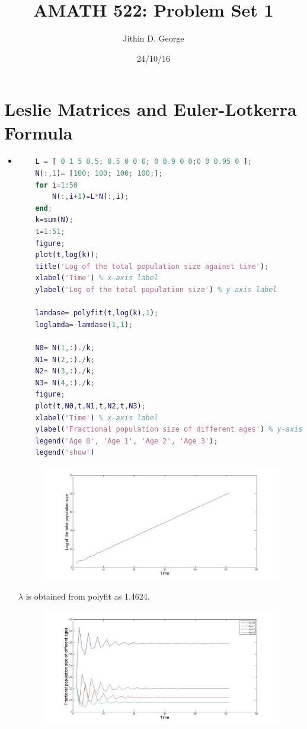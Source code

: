 \documentclass[a4paper]{article}
\title{AMATH 522: Problem Set 1}
\author{Jithin D. George}
\date{24/10/16}
\begin{document}
\maketitle

\section{Leslie Matrices and Euler-Lotkerra Formula}
 \begin{itemize}
 	\item  
 	\begin{lstlisting}[language=Matlab,frame=single]
	%% Problem Set 1 - Euler Lotkerra
	L = [ 0 1 5 0.5; 0.5 0 0 0; 0 0.9 0 0;0 0 0.95 0 ];
	N(:,1)= [100; 100; 100; 100;];
	for i=1:50
		N(:,i+1)=L*N(:,i);
	end;
	k=sum(N);
	t=1:51;
	figure;
	plot(t,log(k));
	title('Log of the total population size against time');
	xlabel('Time') % x-axis label
	ylabel('Log of the total population size') % y-axis label
	
	lamdase= polyfit(t,log(k),1);
	loglamda= lamdase(1,1);
	
	N0= N(1,:)./k;
	N1= N(2,:)./k;
	N2= N(3,:)./k;
	N3= N(4,:)./k;
	figure;
	plot(t,N0,t,N1,t,N2,t,N3);
	xlabel('Time') % x-axis label
	ylabel('Fractional population size of different ages') % y-axis label
	legend('Age 0', 'Age 1', 'Age 2', 'Age 3');
	legend('show')

 	\end{lstlisting}
 	
 	 \begin{figure}[h]
 	 	\centering
 	 	\includegraphics[width=12cm]{F1}
 	 \end{figure}
 
    $\lambda$ is obtained from polyfit as 1.4624.
 	
  	 \begin{figure}[h]
  	 	\centering
  	 	\includegraphics[width=12cm]{F2}
  	 \end{figure}
  	 	

\end{itemize}
\end{document}
